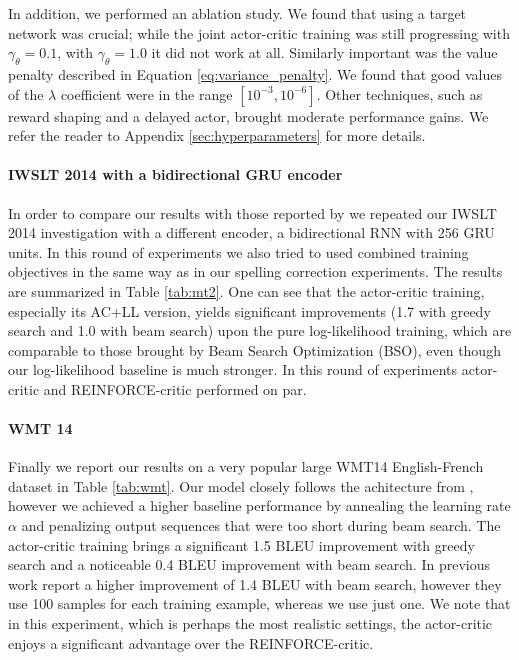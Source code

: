 \documentclass{article} %
\begin{document}
In addition, we performed an ablation study.  We found that using a target network was crucial;  while
the joint actor-critic training was still progressing with $\gamma_{\theta}=0.1$, 
with $\gamma_{\theta}=1.0$ it did not work at all. Similarly
important was the value penalty described in Equation
\eqref{eq:variance_penalty}. We found that good values of the $\lambda$ coefficient
were in the range $[10^{-3}, 10^{-6}]$.  Other
techniques, such as reward shaping and a delayed actor, brought moderate
performance gains. We refer the reader to Appendix \ref{sec:hyperparameters} for more details.

\paragraph{IWSLT 2014 with a bidirectional GRU encoder}
In order to compare our results with those reported by
\citet{wiseman2016sequence} we repeated our IWSLT 2014 investigation with a
different encoder, a bidirectional RNN with 256 GRU units. In this round of
experiments we also tried to used combined training objectives in the same way as in
our spelling correction experiments. The results are summarized in Table \ref{tab:mt2}.
One can see that the actor-critic training, especially its AC+LL version, yields significant improvements (1.7 with greedy search and 1.0 with beam search) upon the pure log-likelihood training, which are comparable to those brought by Beam Search Optimization (BSO), even though our log-likelihood baseline is much stronger. In this round of experiments actor-critic and REINFORCE-critic performed on par.

\paragraph{WMT 14}
Finally we report our results on a very popular
large WMT14 
English-French dataset \citep{cho2014learning} in Table \ref{tab:wmt}. Our
model closely follows the
achitecture from \citep{bahdanau2015neural}, however we achieved a higher
baseline performance by annealing the learning rate $\alpha$ and penalizing 
output sequences that were too short during beam search. The actor-critic training brings a
significant 1.5 BLEU improvement with greedy search and a noticeable 0.4 BLEU
improvement with beam search. In previous work \cite{shen2015minimum}
report a higher improvement of 1.4 BLEU with beam search, however they use 100
samples for each training example, whereas we use just one. We note that in this experiment, which is perhaps the most realistic settings, the actor-critic enjoys a significant advantage over the REINFORCE-critic.
\end{document}
